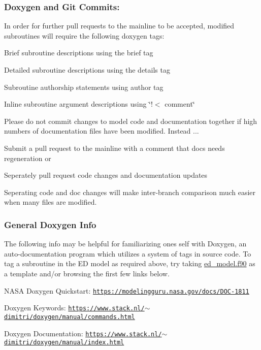 \subsubsection*{\label{_doxygit}%
 Doxygen and Git Commits\+: }

In order for further pull requests to the mainline to be accepted, modified subroutines will require the following doxygen tags\+:
\begin{DoxyEnumerate}
\item Brief subroutine descriptions using the brief tag
\item Detailed subroutine descriptions using the details tag
\item Subroutine authorship statements using author tag
\item Inline subroutine argument descriptions using \char`\"{}!$<$ comment\char`\"{}
\end{DoxyEnumerate}

Please do not commit changes to model code and documentation together if high numbers of documentation files have been modified. Instead ...
\begin{DoxyItemize}
\item Submit a pull request to the mainline with a comment that docs needs regeneration or
\item Seperately pull request code changes and documentation updates
\end{DoxyItemize}

Seperating code and doc changes will make inter-\/branch comparison much easier when many files are modified.

\subsubsection*{\label{_doxyinfo}%
 General Doxygen Info }

The following info may be helpful for familiarizing one\textquotesingle{}s self with Doxygen, an auto-\/documentation program which utilizes a system of tags in source code. To tag a subroutine in the ED model as required above, try taking \hyperlink{ed__model_8_f90}{ed\+\_\+model.\+f90} as a template and/or browsing the first few links below.
\begin{DoxyItemize}
\item N\+A\+SA Doxygen Quickstart\+: \href{https://modelingguru.nasa.gov/docs/DOC-1811}{\tt https\+://modelingguru.\+nasa.\+gov/docs/\+D\+O\+C-\/1811}
\item Doxygen Keywords\+: \href{https://www.stack.nl/~dimitri/doxygen/manual/commands.html}{\tt https\+://www.\+stack.\+nl/$\sim$dimitri/doxygen/manual/commands.\+html}
\item Doxygen Documentation\+: \href{https://www.stack.nl/~dimitri/doxygen/manual/index.html}{\tt https\+://www.\+stack.\+nl/$\sim$dimitri/doxygen/manual/index.\+html}
\end{DoxyItemize}

